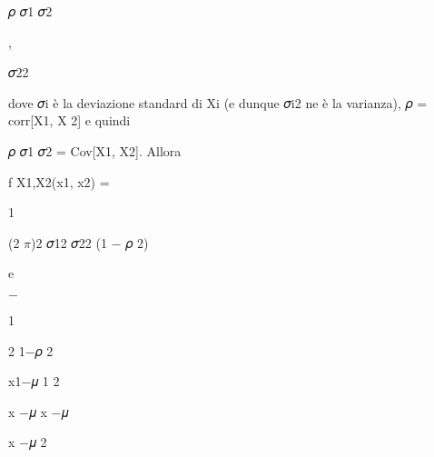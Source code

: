 \documentclass[a4paper,portrait,12pt]{article}
\begin{document}
\begin{flushleft}
𝜌 𝜎1 𝜎2
\end{flushleft}


,


\begin{flushleft}
𝜎22
\end{flushleft}





\begin{flushleft}
dove 𝜎i \`{e} la deviazione standard di Xi (e dunque 𝜎i2 ne \`{e} la varianza), 𝜌 = corr[X1, X 2] e quindi
\end{flushleft}


\begin{flushleft}
𝜌 𝜎1 𝜎2 = Cov[X1, X2]. Allora
\end{flushleft}


\begin{flushleft}
f X1,X2(x1, x2) =
\end{flushleft}





1


\begin{flushleft}
(2 $\pi$)2 𝜎12 𝜎22 (1 $-$ 𝜌 2)
\end{flushleft}





\begin{flushleft}
e
\end{flushleft}





$-$





1


\begin{flushleft}
2 1$-$𝜌 2
\end{flushleft}





\begin{flushleft}
x1$-$𝜇 1 2
\end{flushleft}


\begin{flushleft}
x $-$𝜇 x $-$𝜇
\end{flushleft}


\begin{flushleft}
x $-$𝜇 2
\end{flushleft}
\end{document}
